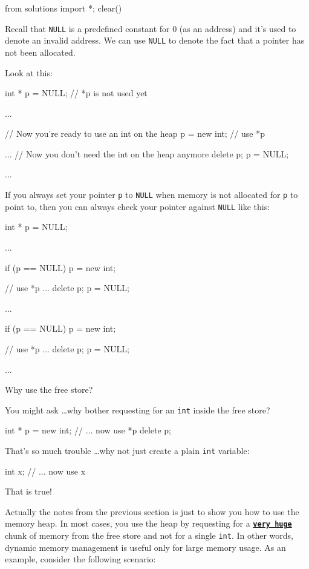 \begin{python0}
from solutions import *; clear()
\end{python0}

Recall that \texttt{NULL} is a predefined constant for 0 (as an address)
and it's used to denote an invalid address. We can use \texttt{NULL} to
denote the fact that a pointer has not been allocated.

Look at this:

\begin{consolethree}[escapeinside=||]
int * p = NULL;
// *p is not used yet

...

// Now you're ready to use an int on the heap
p = new int;
// use *p

...
// Now you don't need the int on the heap anymore
delete p;
p = NULL;

...
\end{consolethree}
If you always set your pointer \texttt{p} to \texttt{NULL} when memory is not allocated for \texttt{p} to point to, then you can always check your pointer against \texttt{NULL} like this:

\begin{consolethree}[escapeinside=||]
int * p = NULL;

...

if (p == NULL)
{
    p = new int;
}

// use *p ...
delete p;
p = NULL;

...

if (p == NULL)
{
    p = new int;
}

// use *p ...
delete p;
p = NULL;

...
\end{consolethree}
Why use the free store?

You might ask \ldots why bother requesting for an \texttt{int} inside the free store?

\begin{consolethree}[escapeinside=||]
int * p = new int;
// ... now use *p
delete p;
\end{consolethree}
That's so much trouble \ldots why not just create a plain \texttt{int} variable:

\begin{consolethree}[escapeinside=||]
int x;
// ... now use x
\end{consolethree}
That is true!

Actually the notes from the previous section is just to show you how to use the memory heap. In most cases, you use the heap by requesting for a \texttt{\textbf{\underline{very huge}}} chunk of memory from the free store and not for a single \texttt{int}. In other words, dynamic memory management is useful only for large memory usage. As an example, consider the following scenario:

